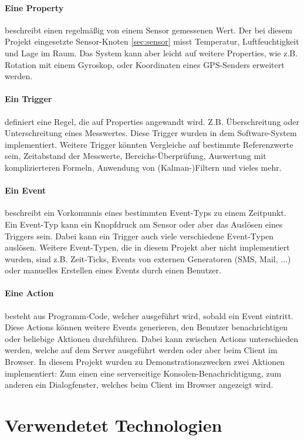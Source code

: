 \documentclass[12pt,a4paper,twoside]{article}
\newcommand{\labelSec}[1]{\label{sec:#1}}
\begin{document}
\paragraph{Eine Property} beschreibt einen regelmäßig von einem Sensor gemessenen Wert. Der bei diesem Projekt eingesetzte Sensor-Knoten \ref{sec:sensor} misst Temperatur, Luftfeuchtigkeit und Lage im Raum. Das System kann aber leicht auf weitere Properties, wie z.B. Rotation mit einem Gyroskop, oder Koordinaten eines GPS-Senders erweitert werden. 
\paragraph{Ein Trigger} definiert eine Regel, die auf Properties angewandt wird. Z.B. Überschreitung oder Unterschreitung eines Messwertes. Diese Trigger wurden in dem Software-System implementiert. Weitere Trigger könnten Vergleiche auf bestimmte Referenzwerte sein, Zeitabstand der Messwerte, Bereichs-Überprüfung, Auswertung mit komplizierteren Formeln, Anwendung von (Kalman-)Filtern  und vieles mehr. 
\paragraph{Ein Event} beschreibt ein Vorkommnis eines bestimmten Event-Typs zu einem  Zeitpunkt. Ein Event-Typ kann ein Knopfdruck am Sensor oder aber das Auslösen eines Triggers sein. Dabei kann ein Trigger auch viele verschiedene Event-Typen auslösen. Weitere Event-Typen, die in diesem Projekt aber nicht implementiert wurden, sind z.B. Zeit-Ticks, Events von externen Generatoren (SMS, Mail, ...) oder manuelles Erstellen eines Events durch einen Benutzer.

\paragraph{Eine Action} besteht aus Programm-Code, welcher ausgeführt wird, sobald ein Event eintritt. Diese Actions können weitere Events generieren, den Benutzer benachrichtigen oder beliebige Aktionen durchführen. Dabei kann zwischen Actions unterschieden werden, welche auf dem Server ausgeführt werden oder aber beim Client im Browser. In diesem Projekt wurden zu Demonstrationszwecken zwei Aktionen implementiert: Zum einen eine serverseitige Konsolen-Benachrichtigung, zum anderen ein Dialogfenster, welches beim Client im Browser angezeigt wird. 

\section{Verwendetet Technologien} \labelSec{abschnitt}
\end{document}
